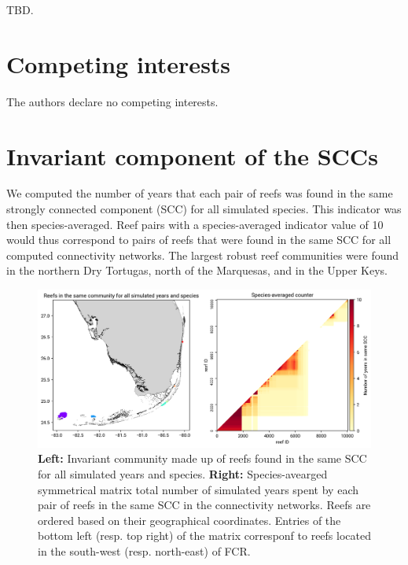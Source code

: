 \documentclass[preprint,12pt,authoryear]{elsarticle}
\begin{document}
	TBD.
	
	\section*{Competing interests}
	
	The authors declare no competing interests.
	
	
	
	
	\newpage
	
	
	\appendix
	
	\section{Invariant component of the SCCs}
	
	We computed the number of years that each pair of reefs was found in the same strongly connected component (SCC) for all simulated species. This indicator was then species-averaged. Reef pairs with a species-averaged indicator value of 10 would thus correspond to pairs of reefs that were found in the same SCC for all computed connectivity networks. The largest robust reef communities were found in the northern Dry Tortugas, north of the Marquesas, and in the Upper Keys.
	
	\begin{figure}[h!]
		\centering
		\includegraphics[width=\textwidth]{figures/mean_counter.png}
		\caption{\textbf{Left:} Invariant community made up of reefs found in the same SCC for all simulated years and species. \textbf{Right:} Species-avearged symmetrical matrix total number of simulated years spent by each pair of reefs in the same SCC in the connectivity networks. Reefs are ordered based on their geographical coordinates. Entries of the bottom left (resp. top right) of the matrix corresponf to reefs located in the south-west (resp. north-east) of FCR.}\label{fig:mean_counter}
	\end{figure}
	
\end{document}
